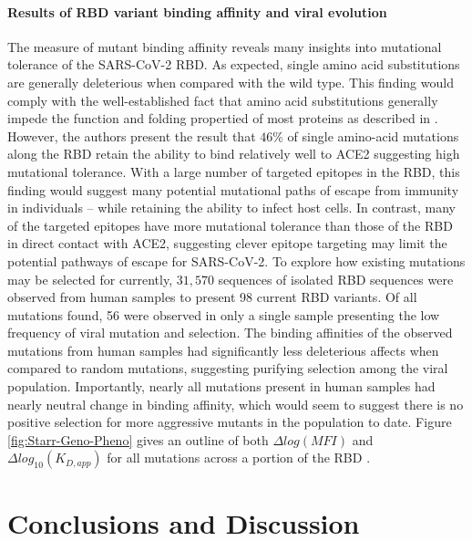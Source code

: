 \documentclass{article}
\begin{document}
\paragraph{Results of RBD variant binding affinity and viral evolution}
The measure of mutant binding affinity reveals many insights into mutational tolerance of the SARS-CoV-2 RBD.
As expected, single amino acid substitutions are generally deleterious when compared with the wild type.
This finding would comply with the well-established fact that amino acid substitutions generally impede the function and folding propertied of most proteins as described in \citet{Soskine2010}.
However, the authors present the result that $46\%$ of single amino-acid mutations along the RBD retain the ability to bind relatively well to ACE2 suggesting high mutational tolerance.
With a large number of targeted epitopes in the RBD, this finding would suggest many potential mutational paths of escape from immunity in individuals -- while retaining the ability to infect host cells.
In contrast, many of the targeted epitopes have more mutational tolerance than those of the RBD in direct contact with ACE2, suggesting clever epitope targeting may limit the potential pathways of escape for SARS-CoV-2.
To explore how existing mutations may be selected for currently, $31,570$ sequences of isolated RBD sequences were observed from human samples to present 98 current RBD variants.
Of all mutations found, 56 were observed in only a single sample presenting the low frequency of viral mutation and selection.
The binding affinities of the observed mutations from human samples had significantly less deleterious affects when compared to random mutations, suggesting purifying selection among the viral population.
Importantly, nearly all mutations present in human samples had nearly neutral change in binding affinity, which would seem to suggest there is no positive selection for more aggressive mutants in the population to date.
Figure \ref{fig:Starr-Geno-Pheno} gives an outline of both $\Delta log(MFI)$ and $\Delta log_{10}(K_{D, app})$ for all mutations across a portion of the RBD \cite{Starr2020}.

\section*{Conclusions and Discussion}
\end{document}
